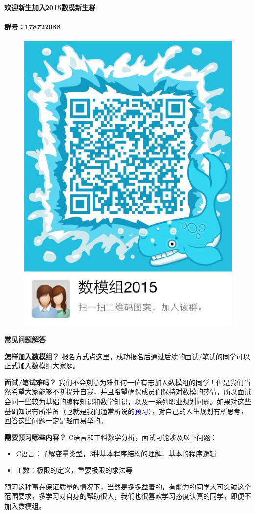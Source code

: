 \documentclass[presentation]{beamer}
\begin{document}
\begin{CJK*}{UTF8}{gbsn}
\begin{frame}{\textbf{欢迎新生加入2015数模新生群}}
\framesubtitle{群号：178722688}
	\begin{figure}
		\includegraphics[width=.45\textwidth]{qq.jpg}
		\label{qun}
	\end{figure}

\end{frame}

\begin{frame}{\textbf{常见问题解答}}
\begin{alertblock}{\textbf{怎样加入数模组？}}
报名方式\textcolor{red}{\hyperlink{signin}{点这里}}，成功报名后通过后续的面试/笔试的同学可以正式加入数模组大家庭。
\end{alertblock}

\begin{block}{\textbf{面试/笔试难吗？}}
我们不会刻意为难任何一位有志加入数模组的同学！但是我们当然希望大家能够不断提升自我，并且希望确保成员们保持对数模的热情，所以面试会问一些较为基础的编程知识和数学知识，以及一系列职业规划问题。如果对这些基础知识有所准备（也就是我们通常所说的\textcolor{blue}{预习}），对自己的人生规划有所思考，回答这些问题一定是轻而易举的。

\end{block}

\end{frame}

\begin{frame}
\begin{alertblock}{\textbf{需要预习哪些内容？}}
C语言和工科数学分析，面试可能涉及以下问题：
\begin{itemize}
    \item C语言：了解变量类型，3种基本程序结构的理解，基本的程序逻辑
    \item 工数：极限的定义，重要极限的求法等
\end{itemize}
预习这种事在保证质量的情况下，当然是多多益善的，有能力的同学大可突破这个范围要求，多学习对自身的帮助很大，我们也很喜欢学习态度认真的同学，即便不加入数模组。
\end{alertblock}


\end{frame}
\end{CJK*}
\end{document}
